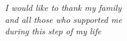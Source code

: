 \thispagestyle{empty}

\begin{center}
  {\bf \Huge }
\end{center}

\vspace{4cm}


\emph{
  \textit{I would like to thank my family \\and all those who supported me \\during this step of my life}
}
